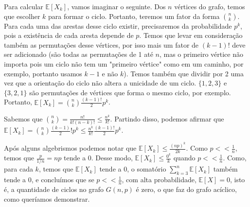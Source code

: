 \documentclass{article}
\begin{document}
\begin{itemize}
	      Para calcular \(\mathbb{E}[X_k]\), vamos imaginar o seguinte. Dos \(n\) vértices do grafo, temos que escolher \(k\) para formar o ciclo. Portanto, teremos um fator
	      da forma \(\binom{n}{k}\). Para cada uma das arestas desse ciclo existir, precisaremos da probabilidade \(p^k\), pois a existência de cada aresta depende de \(p\).
	      Temos que levar em consideração também as permutações desse vértices, por isso mais um fator de \((k-1)!\) deve ser adicionado (são todas as permutações de 1 até \(n\), mas o primeiro vértice não importa pois um ciclo não
	      tem um "primeiro vértice" como em um caminho, por exemplo, portanto usamos \(k-1\) e não \(k\)). Temos também que dividir por 2 uma vez que a orientação do ciclo não altera a unicidade de um ciclo.
	      \(\{1, 2, 3\}\) e \(\{3, 2, 1\}\) são permutações de vértices que forma o mesmo ciclo, por exemplo.
	      Portanto, \(\mathbb{E}[X_k] = \binom{n}{k}\frac{(k-1)!}{2} p^k\).

	      Sabemos que \(\binom{n}{k} = \frac{n!}{k!(n-k)!} \leq \frac{n^k}{k!}\). Partindo disso, podemos afirmar que \(\mathbb{E}[X_k] = \binom{n}{k}\frac{(k-1)}{2}!p^k \leq \frac{n^k}{k!}\frac{(k-1)!}{2}p^k\).

	      Após alguns algebrismos podemos notar que \(\mathbb{E}[X_k] \leq \frac{(np)^k}{2k}\). Como \(p << \frac{1}{n}\), temos que \(\frac{p}{1/n} = np\) tende a 0. Desse modo,
	      \(\mathbb{E}[X_k] \leq \frac{0^k}{k}\) quando \(p << \frac{1}{n}\). Como, para cada \(k\), temos que \(\mathbb{E}[X_k]\) tende a 0, o somatório \(\sum_{k=3}^n \mathbb{E}[X_k]\) também tende a 0,
	      e concluímos que se \(p << \frac{1}{n}\), com alta probabilidade, \(\mathbb{E}[X] = 0\), isto é, a quantidade de ciclos no grafo \(G(n, p)\) é zero, o que faz do grafo
	      acíclico, como queríamos demonstrar.




\end{itemize}
\end{document}
